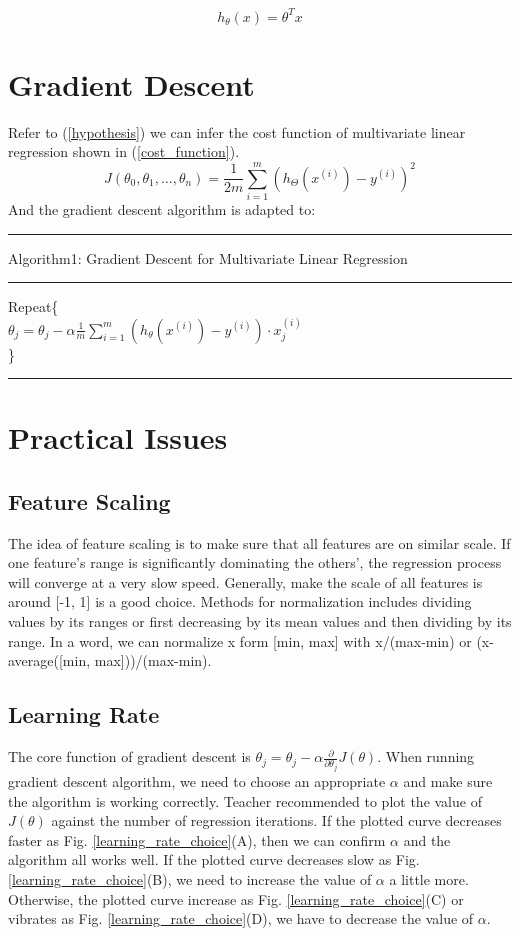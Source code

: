 \documentclass{article}
\begin{document}
\begin{equation}\label{hypothesis_refine}
 h_{\theta}(x) = {\theta}^{T}x
\end{equation}

\section{Gradient Descent}
Refer to (\ref{hypothesis}) we can infer the cost function of multivariate linear regression shown in (\ref{cost_function}).
\begin{equation}\label{cost_function}
  J(\theta_{0}, \theta_{1}, \ldots , \theta_{n}) = \frac{1}{2m} \sum_{i=1}^{m} (h_\Theta({x^{(i)}})-y^{(i)})^2
\end{equation}
And the gradient descent algorithm is adapted to:
\medskip
\hrule
\smallskip
Algorithm1: Gradient Descent for Multivariate Linear Regression
\smallskip
\hrule
\smallskip
Repeat\{\\
$\theta_j=\theta_j - \alpha \frac{1}{m} \sum_{i=1}^{m}(h_\theta(x^{(i)})-y^{(i)}) \cdot x^{(i)}_{j}$\\
\}\\
\hrule

\section{Practical Issues}
\subsection{Feature Scaling}
The idea of feature scaling is to make sure that all features are on similar scale. If one feature's range is significantly dominating the others', the regression process will converge at a very slow speed. Generally, make the scale of all features is around [-1, 1] is a good choice. Methods for normalization includes dividing values by its ranges or first decreasing by its mean values and then dividing by its range. In a word, we can normalize x form [min, max] with x/(max-min) or (x-average([min, max]))/(max-min).
\subsection{Learning Rate}
The core function of gradient descent is $\theta_j =\theta_j - \alpha\frac{\partial}{\partial \theta_j}J(\theta)$. When running gradient descent algorithm, we need to choose an appropriate $\alpha$ and make sure the algorithm is working correctly. Teacher recommended to plot the value of $J(\theta)$ against the number of regression iterations. If the plotted curve decreases faster as Fig. \ref{learning_rate_choice}(A), then we can confirm $\alpha$ and the algorithm all works well. If the plotted curve decreases slow as Fig. \ref{learning_rate_choice}(B), we need to increase the value of $\alpha$ a little more. Otherwise, the plotted curve increase as Fig. \ref{learning_rate_choice}(C) or vibrates as Fig. \ref{learning_rate_choice}(D), we have to decrease the value of $\alpha$.
\end{document}
